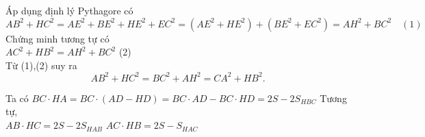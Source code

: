 \begin{bt}
{\begin{center}
\end{center}
\begin{listEX}
\item Áp dụng định lý Pythagore  có\\
$ AB^2 +HC^2 =AE^2+BE^2 +HE^2 +EC^2 =\left ( AE^2+HE^2\right )+\left( BE^2 +EC^2\right) =AH^2 +BC^2 \quad (1)  $
Chứng minh tương tự có \\
{\centering $ AC^2+HB^2 =AH^2 +BC^2 $} \quad (2)\\
Từ (1),(2) suy ra 
$$ AB^2 +HC^2 =BC^2+AH^2 =CA^2 +HB^2. $$
\item Ta có $ BC\cdot HA =BC \cdot (AD-HD) =BC\cdot AD -BC\cdot HD=2S-2S_{HBC} $
Tương tự,\\
$ AB\cdot HC =2S-2S_{HAB} $ 
$ AC\cdot HB =2S -S_{HAC} $


\end{listEX}}
\end{bt}
